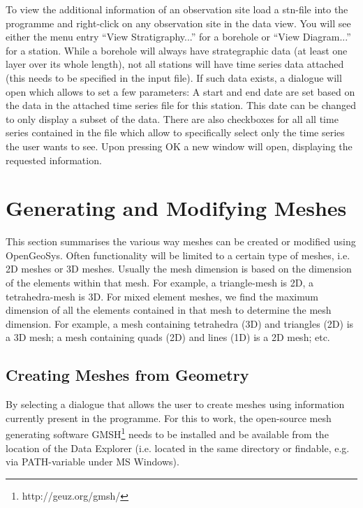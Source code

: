 To view the additional information of an observation site load a stn-file into the programme and right-click on any observation site in the data view. You will see either the menu entry ``View Stratigraphy...'' for a borehole or ``View Diagram...'' for a station. While a borehole will always have strategraphic data (at least one layer over its whole length), not all stations will have time series data attached (this needs to be specified in the input file). If such data exists, a dialogue will open which allows to set a few parameters: A start and end date are set based on the data in the attached time series file for this station. This date can be changed to only display a subset of the data. There are also checkboxes for all all time series contained in the file which allow to specifically select only the time series the user wants to see. Upon pressing OK a new window will open, displaying the requested information.

\section{Generating and Modifying Meshes}

This section summarises the various way meshes can be created or modified using OpenGeoSys. Often functionality will be limited to a certain type of meshes, i.e. 2D meshes or 3D meshes. Usually the mesh dimension is based on the dimension of the elements within that mesh. For example, a triangle-mesh is 2D, a tetrahedra-mesh is 3D. For mixed element meshes, we find the maximum dimension of all the elements contained in that mesh to determine the mesh dimension. For example, a mesh containing tetrahedra (3D) and triangles (2D) is a 3D mesh; a mesh containing quads (2D) and lines (1D) is a 2D mesh; etc.

\subsection{Creating Meshes from Geometry}
\label{meshcreation}

By selecting  a dialogue that allows the user to create meshes using information currently present in the programme. For this to work, the open-source mesh generating software GMSH\footnote{http://geuz.org/gmsh/} needs to be installed and be available from the location of the Data Explorer (i.e. located in the same directory or findable, e.g. via PATH-variable under MS Windows).

